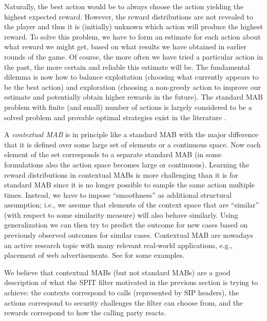 \documentclass{llncs}
\begin{document}
Naturally, the best action would be to always choose the action yielding the highest 
expected reward. However, the reward distributions are not revealed to the player and
thus it is (initially) unknown which action will produce the highest reward. To solve this
problem, we have to form an estimate for each action about what reward we might get, based 
on what results we have obtained in earlier rounds of the game. Of course, the more often
we have tried a particular action in the past, the more certain and reliable this estimate
will be. The fundamental dilemma is now how to balance exploitation (choosing what 
currently appears to be the best action) and exploration (choosing a non-greedy
action to improve our estimate and potentially obtain higher rewards in the future).
The standard MAB problem with finite (and small) number of actions is largely
considered to be a solved problem and provable optimal strategies exist in the
literature \cite{AA,AB}.

A {\em contextual MAB} is in principle like a standard MAB with the major difference that it
is defined over some large set of elements or a continuous space. Now each element
of the set corresponds to a separate standard MAB (in some formulations also 
the action space becomes large or continuous). Learning the reward distributions in 
contextual MABs is more challenging than it is for standard MAB since it is no longer 
possible to sample the same action multiple times. Instead, we have to 
impose ``smoothness'' as additional structural assumption; i.e., we assume that 
elements of the context space that are ``similar'' (with respect to some similarity measure) 
will also behave similarly. Using
generalization we can then try to predict the outcome for new cases based on previously
observed outcomes for similar cases. Contextual MAB are nowadays an active research topic
with many relevant real-world applications, e.g., placement of web advertisements. See 
\cite{b1,b2,b3,DBLP:journals/corr/abs-0907-3986,Kleinberg_STOC08,b4} for some examples.  


We believe that contextual MABs (but not standard MABs) are a good description of what the 
SPIT filter motivated in the previous section is trying to achieve: the contexts correspond 
to calls (represented by SIP headers), the actions correspond to security challenges 
the filter can choose from, and the rewards correspond to how the calling party reacts. 
\end{document}

